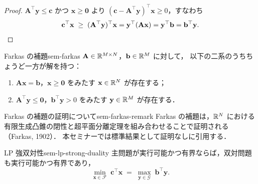 \begin{proof}
  $\mathbf{A}^\top \mathbf{y} \leq \mathbf{c}$ かつ $\mathbf{x} \geq \mathbf{0}$ より
  $(\mathbf{c} - \mathbf{A}^\top \mathbf{y})^\top \mathbf{x} \geq 0$，すなわち
  \[
    \mathbf{c}^\top \mathbf{x}
    \;\geq\;
    (\mathbf{A}^\top \mathbf{y})^\top \mathbf{x}
    = \mathbf{y}^\top(\mathbf{A}\mathbf{x})
    = \mathbf{y}^\top \mathbf{b}
    = \mathbf{b}^\top \mathbf{y}. \qedhere
  \]
\end{proof}

\begin{claim}{Farkas の補題}{sem-farkas}
  $\mathbf{A} \in \mathbb{R}^{M \times N}$，$\mathbf{b} \in \mathbb{R}^M$ に対して，
  以下の二系のうちちょうど一方が解を持つ：
  \begin{enumerate}
    \item[(I)] $\mathbf{A}\mathbf{x} = \mathbf{b}$，$\mathbf{x} \geq \mathbf{0}$
               をみたす $\mathbf{x} \in \mathbb{R}^N$ が存在する；
    \item[(II)] $\mathbf{A}^\top \mathbf{y} \leq \mathbf{0}$，$\mathbf{b}^\top \mathbf{y} > 0$
                をみたす $\mathbf{y} \in \mathbb{R}^M$ が存在する．
  \end{enumerate}
\end{claim}

\begin{remark}{Farkas の補題の証明について}{sem-farkas-remark}
  Farkas の補題は，$\mathbb{R}^N$ における有限生成凸錐の閉性と超平面分離定理を組み合わせることで証明される（Farkas, 1902）．
  本セミナーでは標準結果として証明なしに引用する．
\end{remark}

\begin{theorem}{LP 強双対性}{sem-lp-strong-duality}
  主問題が実行可能かつ有界ならば，双対問題も実行可能かつ有界であり，
  \[
    \min_{\mathbf{x} \in \mathcal{F}}\; \mathbf{c}^\top \mathbf{x}
    \;=\;
    \max_{\mathbf{y} \in \mathcal{G}}\; \mathbf{b}^\top \mathbf{y}.
  \]
\end{theorem}

